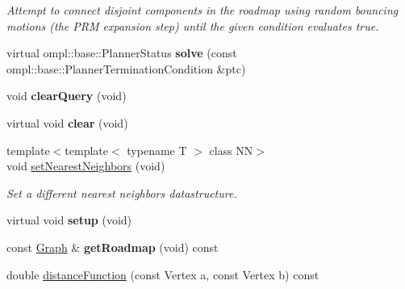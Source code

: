 \begin{DoxyCompactItemize}
\begin{DoxyCompactList}\small\item\em \-Attempt to connect disjoint components in the roadmap using random bouncing motions (the \-P\-R\-M expansion step) until the given condition evaluates true. \end{DoxyCompactList}\item 
\hypertarget{class_f_i_r_m_a02f3c98de4840594193ba5bf7ff3ca63}{virtual ompl\-::base\-::\-Planner\-Status {\bfseries solve} (const ompl\-::base\-::\-Planner\-Termination\-Condition \&ptc)}\label{class_f_i_r_m_a02f3c98de4840594193ba5bf7ff3ca63}

\item 
\hypertarget{class_f_i_r_m_acf7c24814ea6b8cad9cad350dea66560}{void {\bfseries clear\-Query} (void)}\label{class_f_i_r_m_acf7c24814ea6b8cad9cad350dea66560}

\item 
\hypertarget{class_f_i_r_m_afe5298e85713c7a736d6b8936f7171af}{virtual void {\bfseries clear} (void)}\label{class_f_i_r_m_afe5298e85713c7a736d6b8936f7171af}

\item 
\hypertarget{class_f_i_r_m_a8dd7c5ed3fa065f5f37d79bc1d220474}{{\footnotesize template$<$template$<$ typename T $>$ class \-N\-N$>$ }\\void \hyperlink{class_f_i_r_m_a8dd7c5ed3fa065f5f37d79bc1d220474}{set\-Nearest\-Neighbors} (void)}\label{class_f_i_r_m_a8dd7c5ed3fa065f5f37d79bc1d220474}

\begin{DoxyCompactList}\small\item\em \-Set a different nearest neighbors datastructure. \end{DoxyCompactList}\item 
\hypertarget{class_f_i_r_m_a78c43a180deb28296e4cab5c6939c600}{virtual void {\bfseries setup} (void)}\label{class_f_i_r_m_a78c43a180deb28296e4cab5c6939c600}

\item 
\hypertarget{class_f_i_r_m_aacad0b0dfc1413f78c6dc76fdbac9ce7}{const \hyperlink{class_f_i_r_m_a687e9f4243b22c30ee1fa5da22a85053}{\-Graph} \& {\bfseries get\-Roadmap} (void) const }\label{class_f_i_r_m_aacad0b0dfc1413f78c6dc76fdbac9ce7}

\item 
\hypertarget{class_f_i_r_m_a9a98fdb0da781d77fe6ff9a55e8a7a34}{double \hyperlink{class_f_i_r_m_a9a98fdb0da781d77fe6ff9a55e8a7a34}{distance\-Function} (const \-Vertex a, const \-Vertex b) const }\label{class_f_i_r_m_a9a98fdb0da781d77fe6ff9a55e8a7a34}


\end{DoxyCompactItemize}
